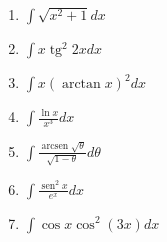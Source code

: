 \documentclass{article}
\begin{document}
\begin{multicols}{2}
\begin{enumerate}
    \item $\displaystyle \int \sqrt{x^2 + 1} dx$
    \item $\displaystyle \int x \operatorname{tg}^2 2x dx$
    \item $\displaystyle \int x (\operatorname{arctan} x)^2 dx$
    \item $\displaystyle \int \frac{\ln x}{x^3} dx$
    \item $\displaystyle \int \frac{\operatorname{arcsen} \sqrt{\theta}}{\sqrt{1 - \theta}} d\theta$
    \item $\displaystyle \int \frac{\operatorname{sen}^2 x}{e^x} dx$
    \item $\displaystyle \int \cos x \cos^2 (3x) dx$
\end{enumerate}
\end{multicols}
\end{document}
